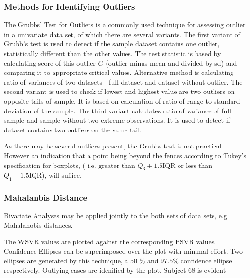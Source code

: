 \documentclass[12pt, a4paper]{report}
\theoremstyle{plain}
\theoremstyle{definition}
\theoremstyle{remark}
\begin{document}
	\subsubsection{Methods for Identifying Outliers}
	The Grubbs' Test for Outliers is a commonly used technique for assessing outlier in a univariate data set, of which there are several variants. The first variant of Grubb's test is used to detect if the sample dataset contains one outlier, statistically different than
	the other values. The test statistic is based by calculating score of this outlier $G$ (outlier minus mean and divided
	by sd) and comparing it to appropriate critical values. Alternative method is calculating ratio of
	variances of two datasets - full dataset and dataset without outlier. 
	The second variant is used to check if lowest and highest value are two outliers on opposite tails of
	sample. It is based on calculation of ratio of range to standard deviation of the sample.
	The third variant calculates ratio of variance of full sample and sample without two extreme observations.
	It is used to detect if dataset contains two outliers on the same tail.
	
	As there may be several outliers present, the Grubbs test is not practical. However an indication that a point being beyond the fences according to Tukey's 
	specification for boxplots, ( i.e. greater than $Q_3 +1.5 \mbox{IQR}$ or less than $Q_1 - 1.5 \mbox{IQR}$), will suffice.
	
	\subsubsection{Mahalanbis Distance}
	Bivariate Analyses may be applied jointly to the both sets of data sets, e.g Mahalanobis distances.
	
	The WSVR values are plotted against the corresponding BSVR values. Confidence Ellipses can be superimposed over the plot with minimal effort. Two ellipses are generated by this technique, a 50 \% and 97.5\% confidence ellipse respectively. Outlying cases are idenified by the plot. Subject 68 is evident
	
\end{document}
